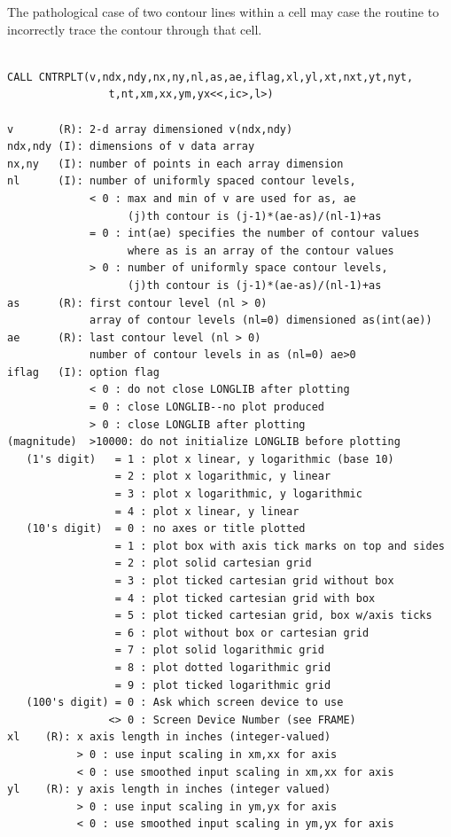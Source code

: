 \documentclass[11pt]{report}
\begin{document}
The pathological case of two contour lines within a cell may case the
routine to incorrectly trace the contour through that cell.
\begin{verbatim}

CALL CNTRPLT(v,ndx,ndy,nx,ny,nl,as,ae,iflag,xl,yl,xt,nxt,yt,nyt,
                t,nt,xm,xx,ym,yx<<,ic>,l>)

v       (R): 2-d array dimensioned v(ndx,ndy)
ndx,ndy (I): dimensions of v data array
nx,ny   (I): number of points in each array dimension
nl      (I): number of uniformly spaced contour levels,
             < 0 : max and min of v are used for as, ae
                   (j)th contour is (j-1)*(ae-as)/(nl-1)+as
             = 0 : int(ae) specifies the number of contour values
                   where as is an array of the contour values
             > 0 : number of uniformly space contour levels,
                   (j)th contour is (j-1)*(ae-as)/(nl-1)+as
as      (R): first contour level (nl > 0)
             array of contour levels (nl=0) dimensioned as(int(ae))
ae      (R): last contour level (nl > 0)
             number of contour levels in as (nl=0) ae>0
iflag   (I): option flag
             < 0 : do not close LONGLIB after plotting
             = 0 : close LONGLIB--no plot produced
             > 0 : close LONGLIB after plotting
(magnitude)  >10000: do not initialize LONGLIB before plotting
   (1's digit)   = 1 : plot x linear, y logarithmic (base 10)
                 = 2 : plot x logarithmic, y linear
                 = 3 : plot x logarithmic, y logarithmic
                 = 4 : plot x linear, y linear
   (10's digit)  = 0 : no axes or title plotted
                 = 1 : plot box with axis tick marks on top and sides
                 = 2 : plot solid cartesian grid
                 = 3 : plot ticked cartesian grid without box
                 = 4 : plot ticked cartesian grid with box
                 = 5 : plot ticked cartesian grid, box w/axis ticks
                 = 6 : plot without box or cartesian grid
                 = 7 : plot solid logarithmic grid
                 = 8 : plot dotted logarithmic grid
                 = 9 : plot ticked logarithmic grid
   (100's digit) = 0 : Ask which screen device to use
                <> 0 : Screen Device Number (see FRAME)
xl    (R): x axis length in inches (integer-valued)
           > 0 : use input scaling in xm,xx for axis
           < 0 : use smoothed input scaling in xm,xx for axis
yl    (R): y axis length in inches (integer valued)
           > 0 : use input scaling in ym,yx for axis
           < 0 : use smoothed input scaling in ym,yx for axis

\end{verbatim}
\end{document}

